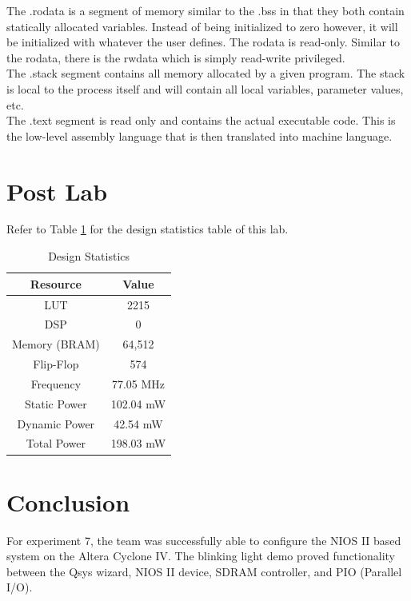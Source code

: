 \documentclass[journal, twocolumn, final,11pt,letterpaper]{IEEEtran}
\begin{document}
The .rodata is a segment of memory similar to the .bss in that they both contain statically allocated variables. Instead of being initialized to zero however, it will be initialized with whatever the user defines. The rodata is read-only. Similar to the rodata, there is the rwdata which is simply read-write privileged. \\

The .stack segment contains all memory allocated by a given program. The stack is local to the process itself and will contain all local variables, parameter values, etc.\\

The .text segment is read only and contains the actual executable code. This is the low-level assembly language that is then translated into machine language.\\

\section{Post Lab}
Refer to Table \ref{tab:table2} for the design statistics table of this lab. \\


\begin{table}[htbp]
	\centering
	\begin{tabular}{c|c}	%
		\toprule	%
		Resource & Value \\
		\midrule
		LUT & 2215 \\
		DSP & 0\\
		Memory (BRAM) & 64,512 \\
		Flip-Flop & 574 \\
		Frequency &  77.05 MHz\\
		Static Power & 102.04 mW\\
		Dynamic Power & 42.54 mW\\
		Total Power & 198.03 mW\\
		\bottomrule	%
	\end{tabular}%
	\caption{Design Statistics}
	\label{tab:table2}	%
\end{table}%

\section{Conclusion}
For experiment 7, the team was successfully able to configure the NIOS II based system on the Altera Cyclone IV. The blinking light demo proved functionality between the Qsys wizard, NIOS II device, SDRAM controller, and PIO (Parallel I/O).\\
\end{document}
